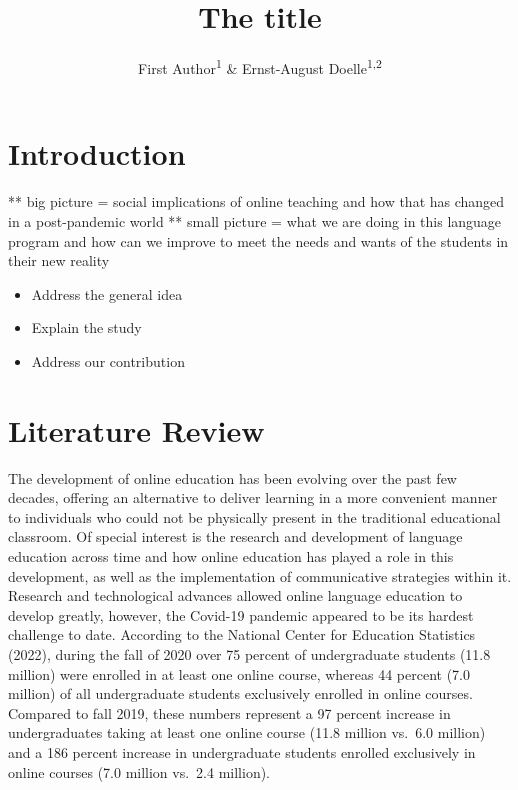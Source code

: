 \documentclass[
  man]{apa6}
\title{The title}
\author{First Author\textsuperscript{1} \& Ernst-August Doelle\textsuperscript{1,2}}
\date{}
\affiliation{\vspace{0.5cm}\textsuperscript{1} Wilhelm-Wundt-University\\\textsuperscript{2} Konstanz Business School}
\begin{document}
\maketitle

\hypertarget{introduction}{%
\section{Introduction}\label{introduction}}

** big picture = social implications of online teaching and how that has changed in a post-pandemic world
** small picture = what we are doing in this language program and how can we improve to meet the needs and wants of the students in their new reality

\begin{itemize}
\item
  Address the general idea
\item
  Explain the study
\item
  Address our contribution
\end{itemize}

\newpage

\hypertarget{literature-review}{%
\section{Literature Review}\label{literature-review}}

The development of online education has been evolving over the past few decades, offering an alternative to deliver learning in a more convenient manner to individuals who could not be physically present in the traditional educational classroom. Of special interest is the research and development of language education across time and how online education has played a role in this development, as well as the implementation of communicative strategies within it. Research and technological advances allowed online language education to develop greatly, however, the Covid-19 pandemic appeared to be its hardest challenge to date. According to the National Center for Education Statistics (2022), during the fall of 2020 over 75 percent of undergraduate students (11.8 million) were enrolled in at least one online course, whereas 44 percent (7.0 million) of all undergraduate students exclusively enrolled in online courses. Compared to fall 2019, these numbers represent a 97 percent increase in undergraduates taking at least one online course (11.8 million vs.~6.0 million) and a 186 percent increase in undergraduate students enrolled exclusively in online courses (7.0 million vs.~2.4 million).
\end{document}
